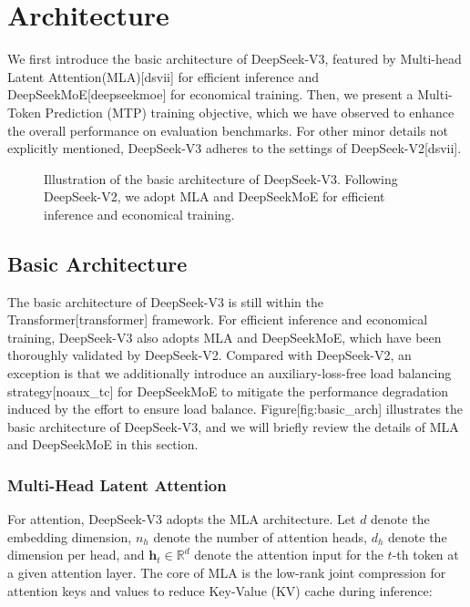 \documentclass[11pt,a4paper]{article}
\begin{document}
\section{Architecture}

We first introduce the basic architecture of DeepSeek-V3, featured by Multi-head Latent Attention(MLA)[dsvii] for efficient inference and DeepSeekMoE[deepseekmoe] for economical training. Then, we present a Multi-Token Prediction (MTP) training objective, which we have observed to enhance the overall performance on evaluation benchmarks. For other minor details not explicitly mentioned, DeepSeek-V3 adheres to the settings of DeepSeek-V2[dsvii].

\begin{figure}[h]
\caption{Illustration of the basic architecture of DeepSeek-V3. Following DeepSeek-V2, we adopt MLA and DeepSeekMoE for efficient inference and economical training.}
\end{figure}

\subsection{Basic Architecture}

The basic architecture of DeepSeek-V3 is still within the Transformer[transformer] framework. For efficient inference and economical training, DeepSeek-V3 also adopts MLA and DeepSeekMoE, which have been thoroughly validated by DeepSeek-V2. Compared with DeepSeek-V2, an exception is that we additionally introduce an auxiliary-loss-free load balancing strategy[noaux\_tc] for DeepSeekMoE to mitigate the performance degradation induced by the effort to ensure load balance. Figure[fig:basic\_arch] illustrates the basic architecture of DeepSeek-V3, and we will briefly review the details of MLA and DeepSeekMoE in this section.

\subsubsection{Multi-Head Latent Attention}

For attention, DeepSeek-V3 adopts the MLA architecture. Let $d$ denote the embedding dimension, $n_h$ denote the number of attention heads, $d_h$ denote the dimension per head, and $\mathbf{h}_{t} \in \mathbb{R}^{d}$ denote the attention input for the $t$-th token at a given attention layer. The core of MLA is the low-rank joint compression for attention keys and values to reduce Key-Value (KV) cache during inference:
\end{document}
